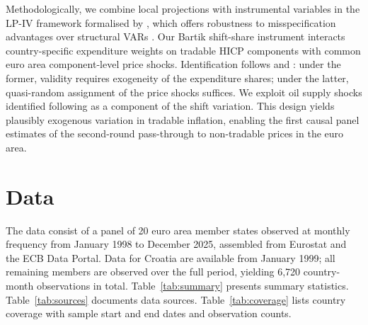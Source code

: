 \documentclass[a4paper,12pt]{article}
\begin{document}
Methodologically, we combine local projections \cite{Jorda2005} with instrumental variables in the LP-IV framework formalised by , which offers robustness to misspecification advantages over structural VARs \cite{Ramey2016}. Our Bartik shift-share instrument interacts country-specific expenditure weights on tradable HICP components with common euro area component-level price shocks. Identification follows  and : under the former, validity requires exogeneity of the expenditure shares; under the latter, quasi-random assignment of the price shocks suffices. We exploit oil supply shocks identified following  as a component of the shift variation. This design yields plausibly exogenous variation in tradable inflation, enabling the first causal panel estimates of the second-round pass-through to non-tradable prices in the euro area.

\section{Data}\label{sec:data}

The data consist of a panel of 20 euro area member states observed at monthly frequency from January 1998 to December 2025, assembled from Eurostat and the ECB Data Portal. Data for Croatia are available from January 1999; all remaining members are observed over the full period, yielding 6,720 country-month observations in total. Table~\ref{tab:summary} presents summary statistics. Table~\ref{tab:sources} documents data sources. Table~\ref{tab:coverage} lists country coverage with sample start and end dates and observation counts.
\end{document}
